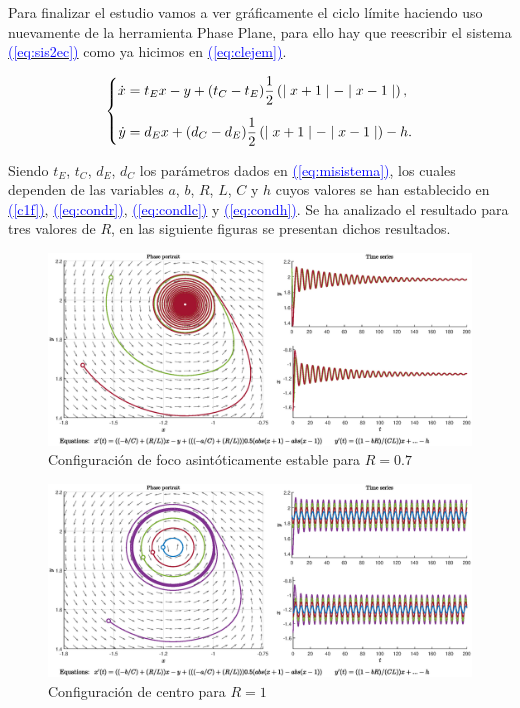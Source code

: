 \documentclass[12pt,a4paper]{report} %
\newcommand{\eref}[1]{\hyperref[#1]{\textcolor{blue}{(\ref*{#1})}}}
\newcommand{\eref}[1]{\hyperref[#1]{\textcolor{blue}{\textit{(\ref*{#1})}}}}
\begin{document}
	\newpage
	
	Para finalizar el estudio vamos a ver gráficamente el ciclo límite haciendo uso nuevamente de la herramienta Phase Plane, para ello hay que reescribir el sistema \eref{eq:sis2ec} como ya hicimos en \eref{eq:clejem}.
	
	\begin{equation}
		\label{eq:clejemsis}
		\scalebox{1}{$\displaystyle
			\left\{
			\begin{aligned}
				\dot{x}&=t_Ex-y+(t_C-t_E)\frac{1}{2}\left( \mid x+1 \mid - \mid x-1 \mid \right),
				\\[2mm]
				\dot{y}&=d_Ex+(d_C-d_E)\frac{1}{2}\left( \mid x+1 \mid - \mid x-1 \mid \right)-h.
			\end{aligned}
			\right. 
			$}
	\end{equation}\smallskip
	
	\vspace{0.5cm}Siendo $t_E$, $t_C$, $d_E$, $d_C$ los parámetros dados en \eref{eq:misistema}, los cuales dependen de las variables $a$, $b$, $R$, $L$, $C$ y $h$ cuyos valores se han establecido en \eref{c1f}, \eref{eq:condr}, \eref{eq:condlc} y \eref{eq:condh}. Se ha analizado el resultado para tres valores de $R$, en las siguiente figuras se presentan dichos resultados.
	
	\begin{figure}[h]
		\centering
		\includegraphics[width=1\textwidth]{r0.7.eps}
		\caption{Configuración de foco asintóticamente estable para $R=0.7$}
		\label{fig:r0.7}
	\end{figure}
	\begin{figure}[h]
		\centering
		\includegraphics[width=1\textwidth]{r1.eps}
		\caption{Configuración de centro para $R=1$}
		\label{fig:r1}
	\end{figure}
	
\end{document}
